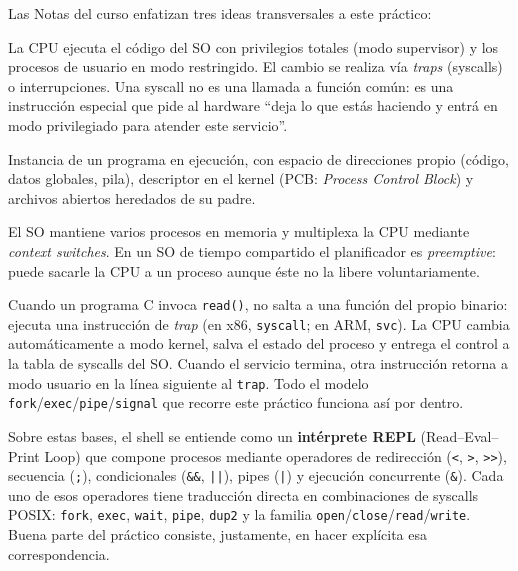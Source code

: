 \documentclass[11pt,a4paper]{article}
\begin{document}
Las Notas del curso enfatizan tres ideas transversales a este práctico:

\begin{description}[leftmargin=*, style=nextline]
    \item[Modo kernel y modo usuario]
        La CPU ejecuta el código del SO con privilegios totales (modo
        supervisor) y los procesos de usuario en modo restringido. El
        cambio se realiza vía \emph{traps} (syscalls) o interrupciones.
        Una syscall no es una llamada a función común: es una
        instrucción especial que pide al hardware ``deja lo que estás
        haciendo y entrá en modo privilegiado para atender este
        servicio''.
    \item[Proceso]
        Instancia de un programa en ejecución, con espacio de
        direcciones propio (código, datos globales, pila), descriptor
        en el kernel (PCB: \emph{Process Control Block}) y archivos
        abiertos heredados de su padre.
    \item[Multitarea / multiprogramación]
        El SO mantiene varios procesos en memoria y multiplexa la CPU
        mediante \emph{context switches}. En un SO de tiempo
        compartido el planificador es \emph{preemptive}: puede
        sacarle la CPU a un proceso aunque éste no la libere
        voluntariamente.
\end{description}

\begin{idea}
Cuando un programa C invoca \texttt{read()}, no salta a una función
del propio binario: ejecuta una instrucción de \emph{trap} (en x86,
\texttt{syscall}; en ARM, \texttt{svc}). La CPU cambia automáticamente
a modo kernel, salva el estado del proceso y entrega el control a la
tabla de syscalls del SO. Cuando el servicio termina, otra instrucción
retorna a modo usuario en la línea siguiente al \texttt{trap}. Todo el
modelo \texttt{fork}/\texttt{exec}/\texttt{pipe}/\texttt{signal} que
recorre este práctico funciona así por dentro.
\end{idea}

Sobre estas bases, el shell se entiende como un \textbf{intérprete
REPL} (Read--Eval--Print Loop) que compone procesos mediante operadores
de redirección (\texttt{<}, \texttt{>}, \texttt{>>}), secuencia
(\texttt{;}), condicionales (\texttt{\&\&}, \texttt{||}), pipes
(\texttt{|}) y ejecución concurrente (\texttt{\&}). Cada uno de esos
operadores tiene traducción directa en combinaciones de syscalls POSIX:
\texttt{fork}, \texttt{exec}, \texttt{wait}, \texttt{pipe},
\texttt{dup2} y la familia \texttt{open}/\texttt{close}/\texttt{read}/\texttt{write}.
Buena parte del práctico consiste, justamente, en hacer explícita esa
correspondencia.
\end{document}
